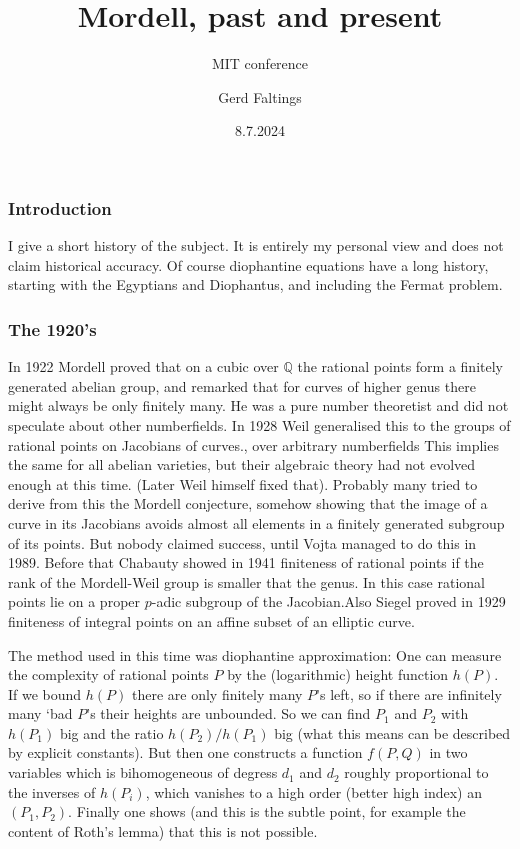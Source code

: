 \documentclass{beamer}
\title{Mordell, past and present}
\subtitle{MIT conference}
\author[G. Faltings]{Gerd Faltings}
\institute[MPIM]{Max Planck Institute for Mathematics}
\date{8.7.2024}
\begin{document}
\begin{frame}
  \titlepage
\end{frame}

\begin{frame}
\frametitle{Introduction}
I give a short history of the subject. It is entirely my personal view and does not claim historical accuracy. Of course diophantine equations have a long history,  starting with the Egyptians and Diophantus, and including the Fermat problem.
\end{frame}
\begin{frame}
\frametitle{The 1920's}
In 1922 Mordell proved that on a cubic over $\mathbb{Q}$ the rational points form a finitely generated abelian group, and remarked that for curves of higher genus there might always be only finitely many. He was a pure number theoretist and did not speculate about other numberfields.  In 1928 Weil generalised this to the groups of rational points on Jacobians of curves., over arbitrary numberfields This implies the same for all abelian varieties, but their algebraic theory had not evolved enough at this time. (Later Weil himself fixed that). Probably many tried to derive from this the Mordell conjecture, somehow showing that the image of a curve in its Jacobians avoids almost all elements in a finitely generated subgroup of its points. But nobody claimed success, until Vojta managed to do this in 1989. Before that Chabauty showed in 1941 finiteness of rational points if the rank of the Mordell-Weil group is smaller that the genus. In this case rational points lie on a proper $p$-adic subgroup of the Jacobian.Also Siegel proved in 1929 finiteness of integral points on an affine subset of an elliptic curve. 
\end{frame}
\begin{frame}
The method used in this time was diophantine approximation: One can measure the complexity of rational points  $P$ by the (logarithmic) height function $h(P)$. If we bound $h(P)$ there are only finitely many $P$'s left, so if there are infinitely many `bad $P$'s their heights are unbounded.
So we can find $P_1$ and $P_2$ with $h(P_1)$ big and the ratio $h(P_2)/h(P_1)$ big (what this means can be described by explicit constants). But then one constructs a function $f(P,Q)$ in two variables which is bihomogeneous of degress $d_1$ and $d_2$ roughly proportional to the inverses of $h(P_i)$, which vanishes to a high order (better high index) an $(P_1,P_2)$. Finally one shows (and this is the subtle point, for example the content of Roth's lemma) that this is not possible.
\end{frame}
\end{document}
